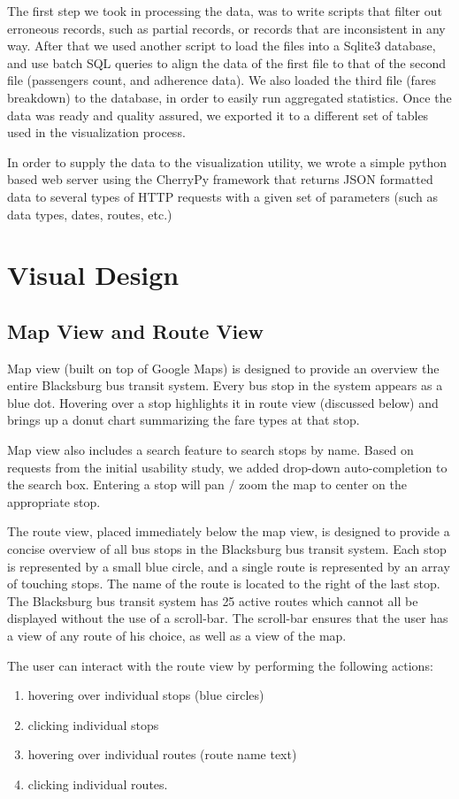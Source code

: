 \documentclass[journal]{vgtc}                %
\begin{document}
The first step we took in processing the data, was to write scripts that filter out erroneous records, such as partial records, or records that are inconsistent in any way. After that we used another script to load the files into a Sqlite3 database, and use batch SQL queries to align the data of the first file to that of the second file (passengers count, and adherence data). We also loaded the third file (fares breakdown) to the database, in order to easily run aggregated statistics. Once the data was ready and quality assured, we exported it to a different set of tables used in the visualization process.

In order to supply the data to the visualization utility, we wrote a simple python based web server using the CherryPy framework that returns JSON formatted data to several types of HTTP requests with a given set of parameters (such as data types, dates, routes, etc.)

\section{Visual Design}
\subsection{Map View and Route View}
Map view (built on top of Google Maps) is designed to provide an overview the entire Blacksburg bus transit system. Every bus stop in the system appears as a blue dot. Hovering over a stop highlights it in route view (discussed below) and brings up a donut chart summarizing the fare types at that stop.

Map view also includes a search feature to search stops by name. Based on requests from the initial usability study, we added drop-down auto-completion to the search box. Entering a stop will pan / zoom the map to center on the appropriate stop.

The route view, placed immediately below the map view, is designed to provide a concise overview of all bus stops in the Blacksburg bus transit system. Each stop is represented by a small blue circle, and a single route is represented by an array of touching stops. The name of the route is located to the right of the last stop. The Blacksburg bus transit system has 25 active routes which cannot all be displayed without the use of a scroll-bar. The scroll-bar ensures that the user has a view of any route of his choice, as well as a view of the map. 

The user can interact with the route view by performing the following actions:
\begin{enumerate}
  \item hovering over individual stops (blue circles)
  \item clicking individual stops 
  \item hovering over individual routes (route name text)
  \item clicking individual routes.
\end{enumerate}
\end{document}
